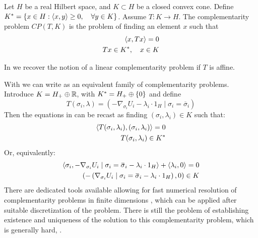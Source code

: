 \begin{definition}
  \label{def:comp_prob}
  Let $H$ be a real Hilbert space, and $K \subset H$ be a closed convex cone. Define $K^* = \{ x \in H : \left \langle x,y \right \rangle \geq 0, \quad \forall y\in K\} $. Assume $T:K \to H$. The complementarity problem $CP(T,K)$ is the problem of finding an element $x$ such that
  \begin{equation}
    \begin{split}
    \left \langle x,Tx \right \rangle = 0 \\
    Tx \in K^*, \quad  x\in K
  \end{split}
  \end{equation}
\end{definition}
In  we recover the notion of a linear complementarity problem if $T$ is affine. %

With  we can write  as an equivalent family of complementarity problems. Introduce $K = H_+ \oplus \mathbb{R}$, with $K^* = H_+ \oplus \{0\}$ and define
\begin{equation}
  T(\sigma_i, \lambda) = (-\nabla_{\sigma_i} U_i - \lambda_i \cdot 1_H \mid{\sigma_i = \overbar{\sigma}_i})
\end{equation}
Then the equations in  can be recast as finding $(\sigma_i,\lambda_i) \in K$ such that:
\begin{equation}
  \label{eq:comp_form}
  \begin{split}
    \left \langle T(\sigma_i,\lambda_i),(\sigma_i,\lambda_i) \right \rangle = 0 \\
    T(\sigma_i,\lambda_i) \in K^*
  \end{split}
\end{equation}
Or, equivalently:
\begin{equation}
  \begin{split}
    \ip{\sigma_i}{-\nabla_{\sigma_i} U_i \mid{\sigma_i = \overbar{\sigma}_i} - \lambda_i \cdot 1_H} + \ip{\lambda_i}{0}= 0 \\
    \pa{-\pa{\nabla_{\sigma_i} U_i \mid{\sigma_i = \overbar{\sigma}_i} - \lambda_i \cdot 1_H}, 0} \in K
  \end{split}
\end{equation}
There are dedicated tools available allowing for fast numerical resolution of complementarity problems in finite dimensions \citep{acary2019introduction, dirkse1995path}, which can be applied after suitable discretization of the problem. There is still the problem of establishing existence and uniqueness of the solution to this complementarity problem, which is generally hard, \citep{hadjisavvas2006handbook}.


